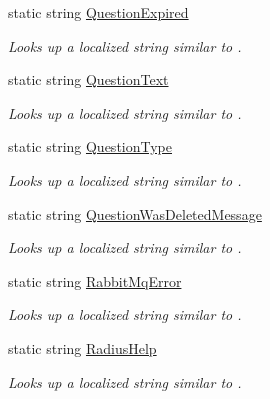 \begin{DoxyCompactItemize}
static string \hyperlink{class_wis_r_1_1_app___resources_1_1_resource_aa06401f86c9d59ed41bfa863d2d28691}{Question\+Expired}
\begin{DoxyCompactList}\small\item\em Looks up a localized string similar to . \end{DoxyCompactList}\item 
static string \hyperlink{class_wis_r_1_1_app___resources_1_1_resource_acb1d86a8605643ee0cc81955c162c748}{Question\+Text}
\begin{DoxyCompactList}\small\item\em Looks up a localized string similar to . \end{DoxyCompactList}\item 
static string \hyperlink{class_wis_r_1_1_app___resources_1_1_resource_aacc711a079206d73efcdbf385ccf1ef1}{Question\+Type}
\begin{DoxyCompactList}\small\item\em Looks up a localized string similar to . \end{DoxyCompactList}\item 
static string \hyperlink{class_wis_r_1_1_app___resources_1_1_resource_a22c93b8f760ae716d9e26e786a37da07}{Question\+Was\+Deleted\+Message}
\begin{DoxyCompactList}\small\item\em Looks up a localized string similar to . \end{DoxyCompactList}\item 
static string \hyperlink{class_wis_r_1_1_app___resources_1_1_resource_a6f2e853d37c61abd70c464f4c5d5ecc2}{Rabbit\+Mq\+Error}
\begin{DoxyCompactList}\small\item\em Looks up a localized string similar to . \end{DoxyCompactList}\item 
static string \hyperlink{class_wis_r_1_1_app___resources_1_1_resource_acc853d0b9207f9217c61ade2ace83f70}{Radius\+Help}
\begin{DoxyCompactList}\small\item\em Looks up a localized string similar to . \end{DoxyCompactList}\item 

\end{DoxyCompactItemize}
